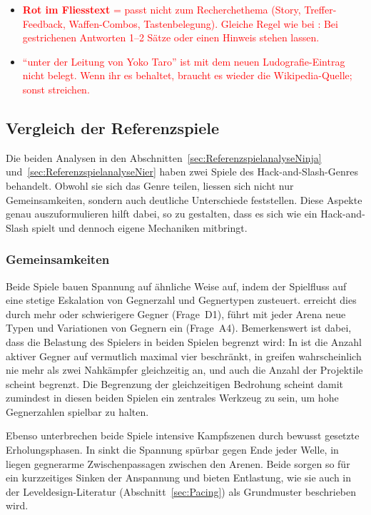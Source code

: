 \documentclass[../Main.tex]{subfiles}
\begin{document}
\begin{itemize}[leftmargin=1.5cm]
    \item \textcolor{red}{\textbf{Rot im Fliesstext} = passt nicht zum Recherchethema (Story, Treffer-Feedback, Waffen-Combos, Tastenbelegung). Gleiche Regel wie bei : Bei gestrichenen Antworten 1--2 Sätze oder einen Hinweis stehen lassen.}
    \item \textcolor{red}{\enquote{unter der Leitung von Yoko Taro} ist mit dem neuen Ludografie-Eintrag nicht belegt. Wenn ihr es behaltet, braucht es wieder die Wikipedia-Quelle; sonst streichen.}
\end{itemize}

\subsection{Vergleich der Referenzspiele} \label{sec:Vergleich}

Die beiden Analysen in den Abschnitten~\ref{sec:ReferenzspielanalyseNinja} und~\ref{sec:ReferenzspielanalyseNier} haben zwei Spiele des Hack-and-Slash-Genres behandelt. Obwohl sie sich das Genre teilen, liessen sich nicht nur Gemeinsamkeiten, sondern auch deutliche Unterschiede feststellen. Diese Aspekte genau auszuformulieren hilft dabei,  so zu gestalten, dass es sich wie ein Hack-and-Slash spielt und dennoch eigene Mechaniken mitbringt.

\subsubsection{Gemeinsamkeiten}

Beide Spiele bauen Spannung auf ähnliche Weise auf, indem der Spielfluss auf eine stetige Eskalation von Gegnerzahl und Gegnertypen zusteuert.  erreicht dies durch mehr oder schwierigere Gegner (Frage~D1),  führt mit jeder Arena neue Typen und Variationen von Gegnern ein (Frage~A4). Bemerkenswert ist dabei, dass die Belastung des Spielers in beiden Spielen begrenzt wird: In  ist die Anzahl aktiver Gegner auf vermutlich maximal vier beschränkt, in  greifen wahrscheinlich nie mehr als zwei Nahkämpfer gleichzeitig an, und auch die Anzahl der Projektile scheint begrenzt. Die Begrenzung der gleichzeitigen Bedrohung scheint damit zumindest in diesen beiden Spielen ein zentrales Werkzeug zu sein, um hohe Gegnerzahlen spielbar zu halten.

Ebenso unterbrechen beide Spiele intensive Kampfszenen durch bewusst gesetzte Erholungsphasen. In  sinkt die Spannung spürbar gegen Ende jeder Welle, in  liegen gegnerarme Zwischenpassagen zwischen den Arenen. Beide sorgen so für ein kurzzeitiges Sinken der Anspannung und bieten Entlastung, wie sie auch in der Leveldesign-Literatur (Abschnitt~\ref{sec:Pacing}) als Grundmuster beschrieben wird.
\end{document}
